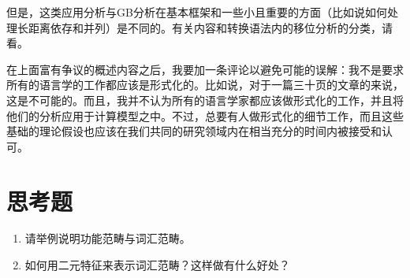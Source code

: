但是，这类应用分析与GB分析在基本框架和一些小且重要的方面（比如说如何处理长距离依存和并列\citep{Gazdar81}）是不同的。有关内容和转换语法内的移位分析的分类，请看。

在上面富有争议的概述内容之后，我要加一条评论以避免可能的误解：我不是要求所有的语言学的工作都应该是形式化的。比如说，对于一篇三十页的文章的来说，这是不可能的。而且，我并不认为所有的语言学家都应该做形式化的工作，并且将他们的分析应用于计算模型之中。不过，总要有人做形式化的细节工作，而且这些基础的理论假设也应该在我们共同的研究领域内在相当充分的时间内被接受和认可。



\section*{思考题}

\begin{enumerate}
\item 请举例说明功能范畴与词汇范畴。
\item 如何用二元特征来表示词汇范畴？这样做有什么好处？
\end{enumerate}

